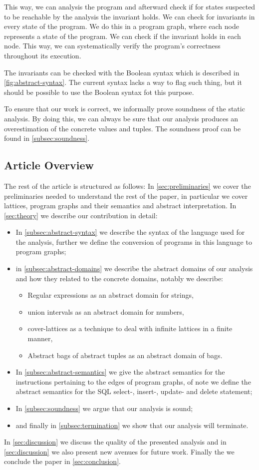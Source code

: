This way, we can analysis the program and afterward check if for states suspected to be reachable by the analysis the invariant holds.
We can check for invariants in every state of the program.
We do this in a program graph, where each node represents a state of the program.
We can check if the invariant holds in each node.
This way, we can systematically verify the program's correctness throughout its execution.

The invariants can be checked with the Boolean syntax which is described in \autoref{fig:abstract-syntax}.
The current syntax lacks a way to flag such thing, but it should be possible to use the Boolean syntax fot this purpose.

To ensure that our work is correct, we informally prove soundness of the static analysis.
By doing this, we can always be sure that our analysis produces an overestimation of the concrete values and tuples.
The soundness proof can be found in \autoref{subsec:soundness}.

\subsection{Article Overview}\label{subsec:article-overview}
The rest of the article is structured as follows:
In \autoref{sec:preliminaries} we cover the preliminaries needed to understand the rest of the paper, in particular we cover lattices, program graphs and their semantics and abstract interpretation.
In \autoref{sec:theory} we describe our contribution in detail:

\begin{itemize}
    \item In \autoref{subsec:abstract-syntax} we describe the syntax of the language used for the analysis, further we define the conversion of programs in this language to program graphs;
    \item in \autoref{subsec:abstract-domains} we describe the abstract domains of our analysis and how they related to the concrete domains, notably we describe:
    \begin{itemize}
        \item Regular expressions as an abstract domain for strings,
        \item union intervals as an abstract domain for numbers,
        \item cover-lattices as a technique to deal with infinite lattices in a finite manner,
        \item Abstract bags of abstract tuples as an abstract domain of bags.
    \end{itemize}
    \item In \autoref{subsec:abstract-semantics} we give the abstract semantics for the instructions pertaining to the edges of program graphs, of note we define the abstract semantics for the SQL select-, insert-, update- and delete statement;
    \item In \autoref{subsec:soundness} we argue that our analysis is sound;
    \item and finally in \autoref{subsec:termination} we show that our analysis will terminate.
\end{itemize}

In \autoref{sec:discussion} we discuss the quality of the presented analysis and in \autoref{sec:discussion} we also present new avenues for future work.
Finally the we conclude the paper in \autoref{sec:conclusion}.



